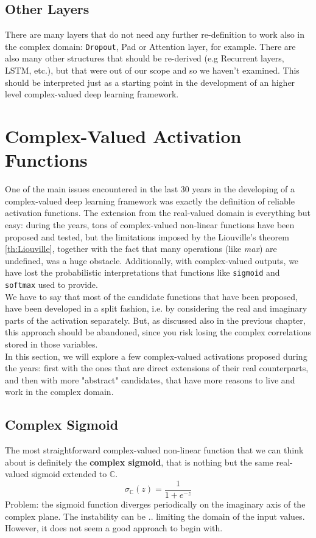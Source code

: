 \documentclass[../main.tex]{subfiles}
\begin{document}
\subsection*{Other Layers}
There are many layers that do not need any further re-definition to work also in the complex domain: \texttt{Dropout}, Pad or Attention layer, for example. There are also many other structures that should be re-derived (e.g Recurrent layers, LSTM, etc.), but that were out of our scope and so we haven't examined. This should be interpreted just as a starting point in the development of an higher level complex-valued deep learning framework.

\section{Complex-Valued Activation Functions}
One of the main issues encountered in the last 30 years in the developing of a complex-valued deep learning framework was exactly the definition of reliable activation functions. The extension from the real-valued domain is everything but easy: during the years, tons of complex-valued non-linear functions have been proposed and tested, but the limitations imposed by the Liouville's theorem \ref{th:Liouville}, together with the fact that many operations (like \textit{max}) are undefined, was a huge obstacle. Additionally, with complex-valued outputs, we have lost the probabilistic interpretations that functions like \texttt{sigmoid} and \texttt{softmax} used to provide.\\
We have to say that most of the candidate functions that have been proposed, have been developed in a split fashion, i.e. by considering the real and imaginary parts of the activation separately. But, as discussed also in the previous chapter, this approach should be abandoned, since you risk losing the complex correlations stored in those variables.\\
In this section, we will explore a few complex-valued activations proposed during the years: first with the ones that are direct extensions of their real counterparts, and then with more "abstract" candidates, that have more reasons to live and work in the complex domain.\\

\subsection*{Complex Sigmoid}
The most straightforward complex-valued non-linear function that we can think about is definitely the \textbf{complex sigmoid}, that is nothing but the same real-valued sigmoid extended to $\mathds{C}$.
\[ \sigma_\mathds{C}(z) = \frac{1}{1+e^{-z}} \]
Problem: the sigmoid function diverges periodically on the imaginary axis of the complex plane. The instability can be .. limiting the domain of the input values. However, it does not seem a good approach to begin with.\\
\end{document}

